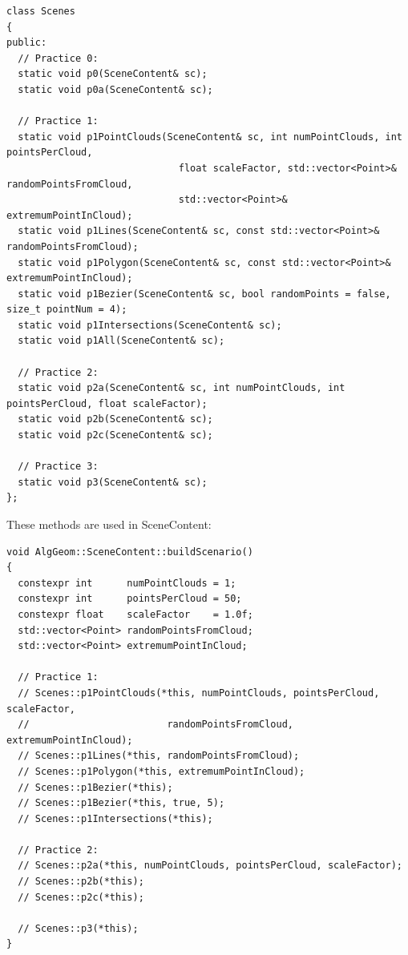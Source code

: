 \documentclass[12pt,a4paper,english]{article}
\begin{document}
\begin{verbatim}
class Scenes
{
public:
  // Practice 0:
  static void p0(SceneContent& sc);
  static void p0a(SceneContent& sc);

  // Practice 1:
  static void p1PointClouds(SceneContent& sc, int numPointClouds, int pointsPerCloud,
                              float scaleFactor, std::vector<Point>& randomPointsFromCloud,
                              std::vector<Point>& extremumPointInCloud);
  static void p1Lines(SceneContent& sc, const std::vector<Point>& randomPointsFromCloud);
  static void p1Polygon(SceneContent& sc, const std::vector<Point>& extremumPointInCloud);
  static void p1Bezier(SceneContent& sc, bool randomPoints = false, size_t pointNum = 4);
  static void p1Intersections(SceneContent& sc);
  static void p1All(SceneContent& sc);

  // Practice 2:
  static void p2a(SceneContent& sc, int numPointClouds, int pointsPerCloud, float scaleFactor);
  static void p2b(SceneContent& sc);
  static void p2c(SceneContent& sc);

  // Practice 3:
  static void p3(SceneContent& sc);
};
\end{verbatim}

These methods are used in SceneContent:

\begin{verbatim}
void AlgGeom::SceneContent::buildScenario()
{
  constexpr int      numPointClouds = 1;
  constexpr int      pointsPerCloud = 50;
  constexpr float    scaleFactor    = 1.0f;
  std::vector<Point> randomPointsFromCloud;
  std::vector<Point> extremumPointInCloud;

  // Practice 1:
  // Scenes::p1PointClouds(*this, numPointClouds, pointsPerCloud, scaleFactor,
  //                        randomPointsFromCloud, extremumPointInCloud);
  // Scenes::p1Lines(*this, randomPointsFromCloud);
  // Scenes::p1Polygon(*this, extremumPointInCloud);
  // Scenes::p1Bezier(*this);
  // Scenes::p1Bezier(*this, true, 5);
  // Scenes::p1Intersections(*this);

  // Practice 2:
  // Scenes::p2a(*this, numPointClouds, pointsPerCloud, scaleFactor);
  // Scenes::p2b(*this);
  // Scenes::p2c(*this);

  // Scenes::p3(*this);
}
\end{verbatim}
\end{document}
